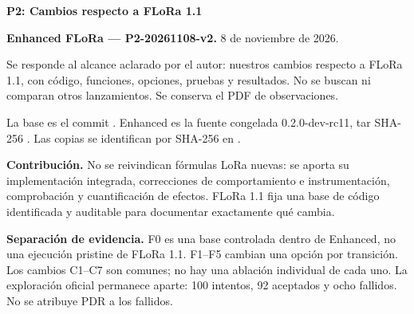 \documentclass[10pt,a4paper]{article}
\begin{document}
\begin{center}\Large\bfseries P2: Cambios respecto a FLoRa 1.1\end{center}
\textbf{Enhanced FLoRa — P2-20261108-v2.} 8 de noviembre de 2026.

Se responde al alcance aclarado por el autor: nuestros cambios respecto a
FLoRa 1.1, con código, funciones, opciones, pruebas y resultados. No se
buscan ni comparan otros lanzamientos. Se conserva el PDF de observaciones.

La base es el commit .
Enhanced es la fuente congelada 0.2.0-dev-rc11, tar SHA-256
.
Las copias se identifican por SHA-256 en .

\textbf{Contribución.} No se reivindican fórmulas LoRa nuevas: se aporta su
implementación integrada, correcciones de comportamiento e instrumentación,
comprobación y cuantificación de efectos. FLoRa 1.1 fija una base de código
identificada y auditable para documentar exactamente qué cambia.

\textbf{Separación de evidencia.} F0 es una base controlada dentro de Enhanced,
no una ejecución pristine de FLoRa 1.1. F1--F5 cambian una opción por transición.
Los cambios C1--C7 son comunes; no hay una ablación individual de cada uno.
La exploración oficial permanece aparte: 100 intentos, 92 aceptados y ocho
fallidos. No se atribuye PDR a los fallidos.
\end{document}
